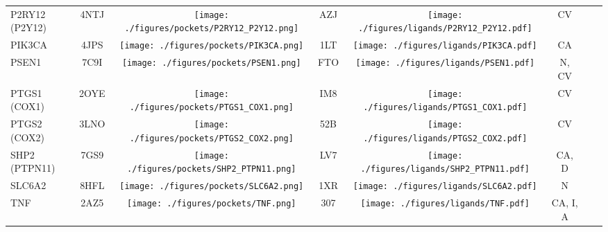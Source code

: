 \begin{ThreePartTable}
\begin{longtable}{l @{\extracolsep{\fill}} *{7}{c}}
P2RY12 (P2Y12)                        & 4NTJ            &        \texttt{[image: ./figures/pockets/P2RY12\_P2Y12.png]}                   & AZJ                    &\texttt{[image: ./figures/ligands/P2RY12\_P2Y12.pdf]}                                             & CV                              \\
PIK3CA                                & 4JPS            &         \texttt{[image: ./figures/pockets/PIK3CA.png]}                  & 1LT                    &\texttt{[image: ./figures/ligands/PIK3CA.pdf]}                                            & CA                                              \\
PSEN1                                 & 7C9I            &       \texttt{[image: ./figures/pockets/PSEN1.png]}                    & FTO                    &\texttt{[image: ./figures/ligands/PSEN1.pdf]}                                              & N, CV     \\
PTGS1 (COX1)                          & 2OYE            &      \texttt{[image: ./figures/pockets/PTGS1\_COX1.png]}                     & IM8                    &\texttt{[image: ./figures/ligands/PTGS1\_COX1.pdf]}                                               & CV                              \\
PTGS2 (COX2)                          & 3LNO            &      \texttt{[image: ./figures/pockets/PTGS2\_COX2.png]}                     & 52B                    &\texttt{[image: ./figures/ligands/PTGS2\_COX2.pdf]}                                               & CV                              \\
SHP2 (PTPN11)                         & 7GS9            &      \texttt{[image: ./figures/pockets/SHP2\_PTPN11.png]}                     & LV7                    &\texttt{[image: ./figures/ligands/SHP2\_PTPN11.pdf]}                                               & CA, D                                    \\
SLC6A2                                & 8HFL            &      \texttt{[image: ./figures/pockets/SLC6A2.png]}                     & 1XR                    &\texttt{[image: ./figures/ligands/SLC6A2.pdf]}                                               & N                             \\
TNF                                   & 2AZ5            &       \texttt{[image: ./figures/pockets/TNF.png]}                    & 307                    &\texttt{[image: ./figures/ligands/TNF.pdf]}                                              & CA, I, A            \\ \bottomrule
\end{longtable}
\end{ThreePartTable}
% 